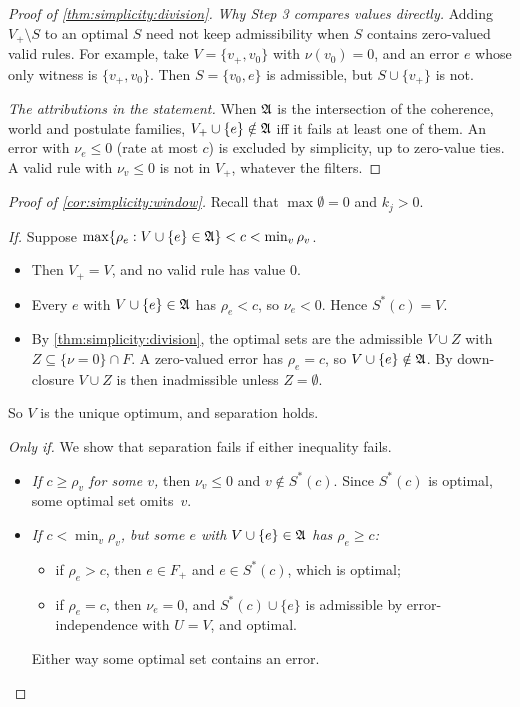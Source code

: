 \begin{proof}[Proof of \cref{thm:simplicity:division}]
\emph{Why Step 3 compares values directly.} Adding $V_+\setminus S$ to an optimal $S$ need not keep admissibility when $S$ contains zero-valued valid rules. For example, take $V=\{v_+,v_0\}$ with $\nu(v_0)=0$, and an error $e$ whose only witness is $\{v_+,v_0\}$. Then $S=\{v_0,e\}$ is admissible, but $S\cup\{v_+\}$ is not.

\emph{The attributions in the statement.} When $\mathfrak A$ is the intersection of the coherence, world and postulate families, $V_+\cup\{e\}\notin\mathfrak A$ iff it fails at least one of them. An error with $\nu_e\le0$ (rate at most $c$) is excluded by simplicity, up to zero-value ties. A valid rule with $\nu_v\le0$ is not in $V_+$, whatever the filters.
\end{proof}

\begin{proof}[Proof of \cref{cor:simplicity:window}]
Recall that $\max\emptyset=0$ and $k_j>0$.

\emph{If.} Suppose $\max\{\rho_e:V\cup\{e\}\in\mathfrak A\}<c<\min_v\rho_v$.
\begin{itemize}
\item Then $V_+=V$, and no valid rule has value $0$.
\item Every $e$ with $V\cup\{e\}\in\mathfrak A$ has $\rho_e<c$, so $\nu_e<0$. Hence $S^*(c)=V$.
\item By \cref{thm:simplicity:division}, the optimal sets are the admissible $V\cup Z$ with $Z\subseteq\{\nu=0\}\cap F$. A zero-valued error has $\rho_e=c$, so $V\cup\{e\}\notin\mathfrak A$. By down-closure $V\cup Z$ is then inadmissible unless $Z=\emptyset$.
\end{itemize}
So $V$ is the unique optimum, and separation holds.

\emph{Only if.} We show that separation fails if either inequality fails.
\begin{itemize}
\item \emph{If $c\ge\rho_v$ for some $v$,} then $\nu_v\le0$ and $v\notin S^*(c)$. Since $S^*(c)$ is optimal, some optimal set omits~$v$.
\item \emph{If $c<\min_v\rho_v$, but some $e$ with $V\cup\{e\}\in\mathfrak A$ has $\rho_e\ge c$:}
  \begin{itemize}
  \item if $\rho_e>c$, then $e\in F_+$ and $e\in S^*(c)$, which is optimal;
  \item if $\rho_e=c$, then $\nu_e=0$, and $S^*(c)\cup\{e\}$ is admissible by error-independence with $U=V$, and optimal.
  \end{itemize}
  Either way some optimal set contains an error.
\end{itemize}
\end{proof}

